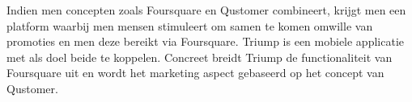 Indien men concepten zoals Foursquare en Qustomer combineert, krijgt men een platform waarbij men mensen stimuleert om samen te komen omwille van promoties en men deze bereikt via Foursquare.
Triump is een mobiele applicatie met als doel beide te koppelen.
Concreet breidt Triump de functionaliteit van Foursquare uit en wordt het marketing aspect gebaseerd op het concept van Qustomer.

